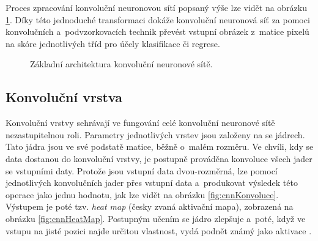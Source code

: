 Proces zpracování konvoluční neuronovou sítí popsaný výše lze vidět na obrázku \ref{fig:cnn}. Díky této jednoduché transformaci dokáže konvoluční neuronová síť za pomoci konvolučních a~podvzorkovacích technik převést vstupní obrázek z~matice pixelů na skóre jednotlivých tříd pro účely klasifikace či regrese.

\begin{figure}[H]
    \centering
    \caption{Základní architektura konvoluční neuronové sítě.}
    \label{fig:cnn}
\end{figure}

\subsection*{Konvoluční vrstva}
Konvoluční vrstvy sehrávají ve fungování celé konvoluční neuronové sítě nezastupitelnou roli. Parametry jednotlivých vrstev jsou založeny na  se jádrech. Tato jádra jsou ve své podstatě matice, běžně o~malém rozměru. Ve chvíli, kdy se data dostanou do konvoluční vrstvy, je postupně prováděna konvoluce všech jader se vstupními daty. Protože jsou vstupní data dvou-rozměrná, lze pomocí jednotlivých konvolučních jader  přes vstupní data a~produkovat výsledek této operace jako jednu hodnotu, jak lze vidět na obrázku \ref{fig:cnnKonvoluce}. Výstupem je poté tzv. \emph{heat map} (česky zvaná aktivační mapa), zobrazená na obrázku \ref{fig:cnnHeatMap}. Postupným učením se jádro zlepšuje a~poté, když ve vstupu na jisté pozici najde určitou vlastnost, vydá podnět známý jako aktivace \cite{CNN}.

